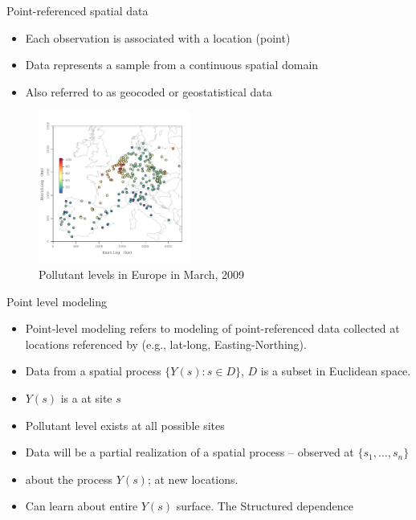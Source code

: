 \begin{frame}{Point-referenced spatial data}
	\begin{itemize}
				\item Each observation  is associated with a location (point) 
				\item Data represents a sample from a continuous spatial domain
				\item Also referred to as \alert {geocoded} or \alert {geostatistical} data
			\end{itemize}

		\begin{figure}
			\begin{center}
				\vskip -5mm\includegraphics[width=5cm]{../figures/march-obs.pdf}
				\caption{Pollutant levels in Europe in March, 2009}
			\end{center}
		\end{figure}
\end{frame}

\begin{frame}{Point level modeling}
	\begin{itemize}
		\item \alert{Point-level modeling} refers to modeling of point-referenced data collected at locations referenced by  (e.g., lat-long, Easting-Northing). %
		
		\item Data from a spatial process $\{Y(s): s \in D\}$, $D$ is a subset in
		Euclidean space. %
		
		\item {} $Y(s)$ is a  at site $s$ %
		
		\item {} Pollutant level exists at all possible sites %
		
		\item {} Data will be a partial realization of a spatial process -- observed at $\{s_1,\ldots,s_n\}$ %
		
		\item {}  about the process $Y(s)$;  at new locations.
		
		\item {} Can learn about entire $Y(s)$ surface.  The  Structured dependence
	\end{itemize}
\end{frame}

